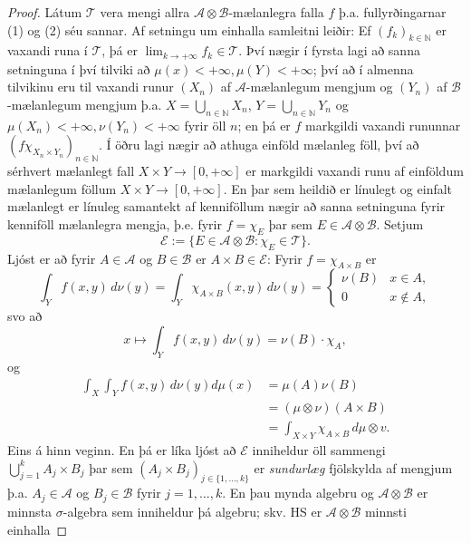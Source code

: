 \documentclass[a4paper,icelandic,11pt]{book}
\theoremstyle{plain}      \newtheorem{setn}{Setning}[chapter]
\theoremstyle{definition} \newtheorem{skilgr}[setn]{Skilgreining}
\theoremstyle{remark}     \newtheorem*{ath}{Athugasemd}
\newcommand{\N}{\mathbb N}
\begin{document}
\begin{proof}
  Látum $\mathcal T$ vera mengi allra $\mathcal A\otimes\mathcal
  B$-mælanlegra falla $f$ þ.a. fullyrðingarnar (1) og (2) séu
  sannar. Af setningu um einhalla samleitni leiðir: Ef
  $(f_{k})_{k\in\N}$ er vaxandi runa í $\mathcal T$, þá er $\lim_{k\to
    +\infty}f_{k}\in\mathcal T$. Því nægir í fyrsta lagi að sanna
  setninguna í því tilviki að $\mu(x) < +\infty, \mu(Y) < +\infty$;
  því að í almenna tilvikinu eru til vaxandi runur $(X_{n})$ af
  $\mathcal A$-mælanlegum mengjum og $(Y_{n})$ af $\mathcal
  B$-mælanlegum mengjum þ.a. $X = \bigcup_{n\in\N}X_{n}$,
  $Y=\bigcup_{n\in\N} Y_{n}$ og $\mu(X_{n}) < +\infty, \nu(Y_{n}) <
  +\infty$ fyrir öll $n$; en þá er $f$ markgildi vaxandi rununnar
  $(f\chi_{X_{n}\times Y_{n}})_{n\in\N}$. Í öðru lagi nægir að athuga
  einföld mælanleg föll, því að sérhvert mælanlegt fall $X\times
  Y\to[0,+\infty]$ er markgildi vaxandi runu af einföldum mælanlegum
  föllum $X\times Y\to[0,+\infty]$. En þar sem heildið er línulegt og
  einfalt mælanlegt er línuleg samantekt af kenniföllum nægir að sanna
  setninguna fyrir kenniföll mælanlegra mengja, þ.e. fyrir
  $f=\chi_{E}$ þar sem $E\in\mathcal A\otimes\mathcal B$. Setjum
  \[
  \mathcal E :=
  \{ E\in \mathcal A\otimes\mathcal B : \chi_{E}\in\mathcal T \}.
  \]
  Ljóst er að fyrir $A\in\mathcal A$ og $B\in\mathcal B$ er $A\times
  B\in\mathcal E$: Fyrir $f=\chi_{A\times B}$ er 
  \[
  \int_{Y}f(x,y)\,d\nu(y)
  = \int_{Y}\chi_{A\times B}(x,y)\,d\nu(y)
  =
  \begin{cases}
    \nu(B) & x\in A, \\
    0      & x\notin A,
  \end{cases}
  \]
  svo að 
  \[
  x\mapsto \int_{Y}f(x,y)\,d\nu(y)
  = \nu(B)\cdot\chi_{A},
  \]
  og
  \begin{align*}
    \int_{X}\int_{Y}
    f(x,y)\,d\nu(y)d\mu(x)
    &= \mu(A)\nu(B)
    \\
    &= (\mu\otimes\nu)(A\times B)
    \\
    &= \int_{X\times Y}\chi_{A\times B}\,d\mu\otimes v.
  \end{align*}
  Eins á hinn veginn. En þá er líka ljóst að $\mathcal E$ inniheldur
  öll sammengi $\bigcup_{j=1}^{k}A_{j}\times B_{j}$ þar sem
  $(A_{j}\times B_{j})_{j\in\{1,\dots,k\}}$ er \emph{sundurlæg}
  fjölskylda af mengjum þ.a. $A_{j}\in\mathcal A$ og $B_{j}\in\mathcal
  B$ fyrir $j=1,\dots,k$. En þau mynda algebru og $\mathcal
  A\otimes\mathcal B$ er minnsta $\sigma$-algebra sem inniheldur þá
  algebru; skv. HS er $\mathcal A\otimes \mathcal B$ minnsti einhalla

\end{proof}
\end{document}
